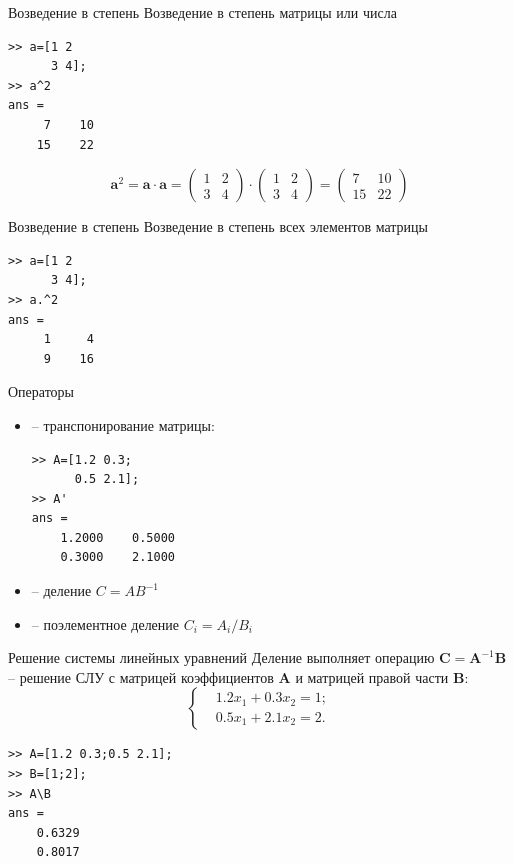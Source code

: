 \documentclass[11pt, compress]{beamer}
\begin{document}
\begin{frame}[fragile]{Возведение в степень}
Возведение в степень матрицы или числа 
\begin{lstlisting}
>> a=[1 2
      3 4];
>> a^2
ans =
     7    10
    15    22   
\end{lstlisting}
$$
  \boldsymbol a^2 = \boldsymbol a \cdot \boldsymbol a = 
  \begin{pmatrix} 1 & 2 \\ 3 & 4 \end{pmatrix} \cdot \begin{pmatrix} 1 & 2 \\ 3 & 4  \end{pmatrix} = \begin{pmatrix} 7 & 10 \\ 15 & 22 \end{pmatrix}
$$
\end{frame}

\begin{frame}[fragile]{Возведение в степень}
Возведение в степень всех элементов матрицы
\begin{lstlisting}
>> a=[1 2
      3 4];
>> a.^2
ans =
     1     4
     9    16   
\end{lstlisting}
\end{frame}

\begin{frame}[fragile]{Операторы}
  \begin{itemize}
   \item {} -- транспонирование матрицы:
\begin{lstlisting}
>> A=[1.2 0.3;
      0.5 2.1];
>> A'
ans =
    1.2000    0.5000
    0.3000    2.1000
\end{lstlisting}   
   \item {} -- деление $C=A B^{-1}$
   \item {} -- поэлементное деление $C_i=A_i / B_i$ \\
  \end{itemize}
\end{frame}

\begin{frame}[fragile]{Решение системы линейных уравнений}
  Деление  выполняет операцию $\boldsymbol C=\boldsymbol A^{-1} \boldsymbol B$ -- решение СЛУ с матрицей коэффициентов $\boldsymbol A$ и матрицей правой части $\boldsymbol B$:
$$
\left\{
\begin{aligned}
  & 1.2 x_1 + 0.3 x_2 = 1; \\
  & 0.5 x_1 + 2.1 x_2 = 2.
\end{aligned}  
\right.
$$
\begin{lstlisting}
>> A=[1.2 0.3;0.5 2.1];
>> B=[1;2];
>> A\B
ans =
    0.6329
    0.8017
\end{lstlisting}
\end{frame}
\end{document}
